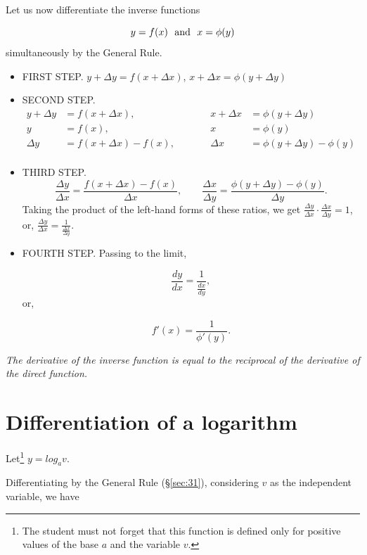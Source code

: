 Let us now differentiate the inverse functions

\[
   y = f(x)\ \ {\rm and}\ \  x = \phi(y)
\]
simultaneously by the General Rule.

\begin{itemize}
\item  
FIRST STEP. $	y + \Delta y 	= f(x + \Delta x)$, $	x + \Delta x =\phi(y + \Delta y)$
\item  
SECOND STEP. 
\[
\begin{array}{rlcrl}
y + \Delta y &	= f(x + \Delta x),  & \qquad & 	x + \Delta x &=	\phi (y + \Delta y)\\
  	y &= f(x),  & \qquad &	x &=\phi (y)\\
\Delta y &= f(x + \Delta x) - f(x), & \qquad &	\Delta x &= \phi(y + \Delta y) - \phi (y)\\
\end{array}
\]

\item  
THIRD STEP. 
\[
\frac{\Delta y}{\Delta x} = \frac{f(x + \Delta x) - f(x)}{\Delta x},
\qquad
\frac{\Delta x}{\Delta y} = \frac{\phi(y + \Delta y) - \phi(y)}{\Delta y}.
\]
Taking the product of the left-hand forms of these ratios, we get
$\frac{\Delta y}{\Delta x} \cdot \frac{\Delta x}{\Delta y} 	= 1$,
or, 	$\frac{\Delta y}{\Delta x} 	= \frac{1}{\frac{\Delta x}{\Delta y}}$.

\item  
FOURTH STEP. Passing to the limit,

\begin{equation}
	\frac{dy}{dx} 	= \frac{1}{\frac{dx}{dy}},
\label{eqn:C-43}
\end{equation}
or,

\[
	f'(x) 	= \frac{1}{\phi'(y)}.
\]
\end{itemize}

{\it The derivative of the inverse function is equal to the reciprocal 
of the derivative of the direct function.}


\section{Differentiation of a logarithm}
\label{sec:44}

Let\footnote{The student must not forget that this function is defined 
only for positive values of the base $a$ and the variable $v$.}
$y = log_av$.

Differentiating by the General Rule %
(\S \ref{sec:31}), %
considering $v$ as the independent variable, we have

